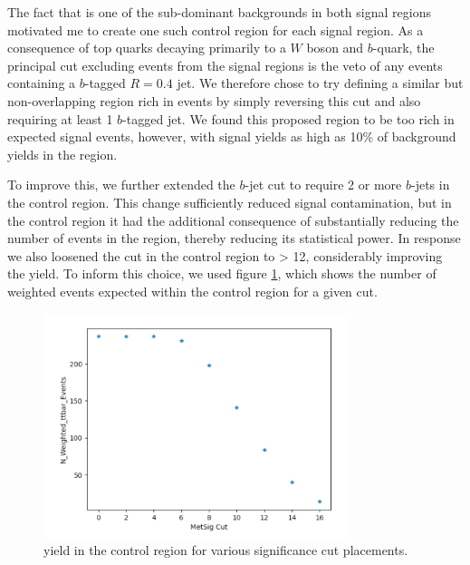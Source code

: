 The fact that \ttbar is one of the sub-dominant backgrounds in both signal regions motivated me to create one such control region for each signal region. As a consequence of top quarks decaying primarily to a $W$ boson and $b$-quark, the principal cut excluding \ttbar events from the signal regions is the veto of any events containing a $b$-tagged \akt $R=0.4$ jet. We therefore chose to try defining a similar but non-overlapping region rich in \ttbar events by simply reversing this cut and also requiring at least 1 $b$-tagged jet. We found this proposed region to be too rich in expected signal events, however, with signal yields as high as 10\% of background yields in the \merged region.

To improve this, we further extended the $b$-jet cut to require 2 or more $b$-jets in the control region. This change sufficiently reduced signal contamination, but in the \merged control region it had the additional consequence of substantially reducing the number of events in the region, thereby reducing its statistical power.  In response we also loosened the \metsig cut in the \merged \ttbar control region to \metsig > 12, considerably improving the \ttbar yield. To inform this choice, we used figure \ref{fig:ttbar_metsig_placement}, which shows the number of weighted \ttbar events expected within the \merged control region for a given \metsig cut.

\begin{figure}[htbp]
    \centering
       \includegraphics[width = 0.80\textwidth]{Figures/4/ttbarCR/ttbar_metsig_placement.png}
       \caption{\ttbar yield in the \merged \ttbar control region for various \met significance cut placements.}
       \label{fig:ttbar_metsig_placement}
\end{figure}

